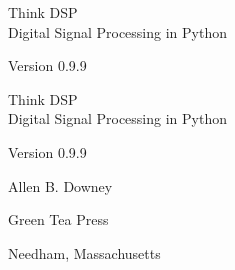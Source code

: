 \documentclass[12pt]{book}
\newcommand{\theversion}{0.9.9}
\begin{document}
\begin{latexonly}

\renewcommand{\blankpage}{\thispagestyle{empty} \quad \newpage}


\thispagestyle{empty}

\begin{flushright}
\vspace*{2.0in}

\begin{spacing}{3}
{\huge Think DSP}\\
{\Large Digital Signal Processing in Python}
\end{spacing}

\vspace{0.25in}

Version \theversion

\vfill

\end{flushright}


\blankpage
\blankpage

\pagebreak
\thispagestyle{empty}

\begin{flushright}
\vspace*{2.0in}

\begin{spacing}{3}
{\huge Think DSP}\\
{\Large Digital Signal Processing in Python}
\end{spacing}

\vspace{0.25in}

Version \theversion

\vspace{1in}


{\Large
Allen B. Downey\\
}


\vspace{0.5in}

{\Large Green Tea Press}

{\small Needham, Massachusetts}

\vfill

\end{flushright}


\pagebreak
\thispagestyle{empty}


\end{latexonly}
\end{document}
